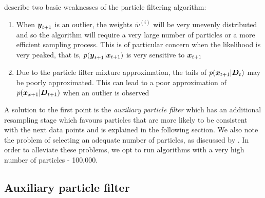 \cite{Pitt1999} describe two basic weaknesses of the particle filtering algorithm:
\begin{enumerate}
  \item When \(\boldsymbol{y}_{t+1}\) is an outlier, the weights \(\overline{w}^{(i)}\) will be very unevenly distributed and so
  the algorithm will require a very large number of particles or a more efficient sampling process. This is of
  particular concern when the likelihood is very peaked, that is, \(p(\boldsymbol{y}_{t+1} | \boldsymbol{x}_{t+1})\) is very sensitive
  to \(\boldsymbol{x}_{t+1}\)
  \item Due to the particle filter mixture approximation, the tails of \(p(\boldsymbol{x}_{t+1} | \boldsymbol{D}_t)\) may be poorly
  approximated. This can lead to a poor approximation of \(p(\boldsymbol{x}_{x+1} | \boldsymbol{D}_{t+1})\) when an outlier is observed
\end{enumerate}
A solution to the first point is the \textit{auxiliary particle filter} which has an additional resampling stage which
favours particles that are more likely to be consistent with the next data points and is explained in the following section. We
also note the problem of selecting an adequate number of particles, as discussed by \cite{boers1999}. In order to
alleviate these problems, we opt to run algorithms with a very high number of particles - 100,000.

\subsection{Auxiliary particle filter}
\label{sec:Auxiliary_particle_filter}

